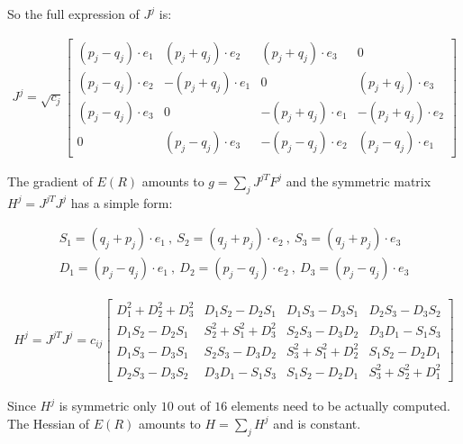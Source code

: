 \documentclass{birkjour}
\numberwithin{equation}{section}
\begin{document}
So the full expression of $J^j$ is:

\begin{eqnarray*}
J^j = \sqrt{c_j}
\left[\begin{array}{cccc}
(p_j - q_j) \cdot e_1 & (p_j + q_j) \cdot e_2  & (p_j  + q_j) \cdot e_3  & 0\\ 
(p_j - q_j) \cdot e_2 & -(p_j + q_j) \cdot e_1 & 0                       & (p_j  + q_j) \cdot e_3\\
(p_j - q_j) \cdot e_3 & 0                      & -(p_j  + q_j) \cdot e_1 & -(p_j  + q_j) \cdot e_2\\ 
0                     & (p_j - q_j) \cdot e_3  & -(p_j - q_j) \cdot e_2  & (p_j - q_j) \cdot e_1
\end{array}\right]
\end{eqnarray*}

The gradient of $E(R)$ amounts to $g = \sum_j{J^{jT} F^j}$ and the symmetric matrix $H^j = J^{jT} J^j$ has a simple form:

\begin{eqnarray*}
S_1 = (q_j + p_j) \cdot e_1 \ , \ S_2 = (q_j + p_j) \cdot e_2 \ , \ S_3 = (q_j + p_j) \cdot e_3\\
D_1 = (p_j - q_j) \cdot e_1 \ , \ D_2 = (p_j - q_j) \cdot e_2 \ , \ D_3 = (p_j - q_j) \cdot e_3
\end{eqnarray*}

\begin{eqnarray*}
H^j = J^{jT} J^j = c_{ij}
\left[\begin{array}{cccc}
D_1^2 + D_2^2 + D_3^2    & D_1 S_2 - D_2 S_1      & D_1 S_3 - D_3 S_1     & D_2 S_3 - D_3 S_2\\ 
D_1 S_2 - D_2 S_1        & S_2^2 + S_1^2 + D_3^2  & S_2 S_3 - D_3 D_2     & D_3 D_1 - S_1 S_3 \\
D_1 S_3 - D_3 S_1        & S_2 S_3 - D_3 D_2      & S_3^2 + S_1^2 + D_2^2 & S_1 S_2 - D_2 D_1\\ 
D_2 S_3 - D_3 S_2        & D_3 D_1 - S_1 S_3      & S_1 S_2 - D_2 D_1     & S_3^2 + S_2^2 + D_1^2
\end{array}\right]
\end{eqnarray*}

Since $H^j$ is symmetric only $10$ out of $16$ elements need to be actually computed. The Hessian of $E(R)$ amounts to $H = \sum_j{H^j}$ and is constant.
\end{document}
